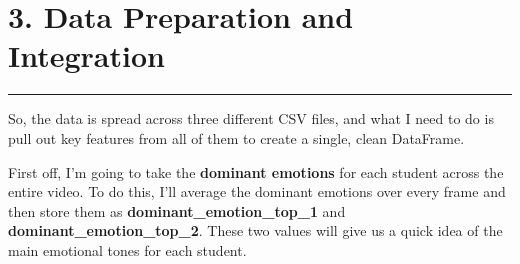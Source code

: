 \documentclass{article}
\newcommand{\highlight}[1]{\textsf{\textbf{#1}}}  %
\begin{document}
\section{3. Data Preparation and Integration}

  \begin{center}
        \color{red}\rule{1\linewidth}{1mm}
    \end{center}
    
So, the data is spread across three different CSV files, and what I need to do is pull out key features from all of them to create a single, clean DataFrame.

\noindent\sffamily
First off, I’m going to take the \highlight{dominant emotions} for each student across the entire video. To do this, I’ll average the dominant emotions over every frame and then store them as \highlight{dominant\_emotion\_top\_1} and \highlight{dominant\_emotion\_top\_2}. These two values will give us a quick idea of the main emotional tones for each student.
\end{document}
